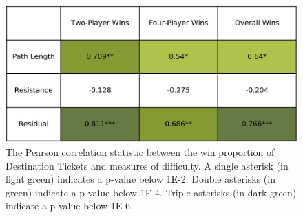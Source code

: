 \begin{multicols}{2}
\begin{figure}[H]
    \centering
    \includegraphics[scale=.12]{figures/pearsons_table.png}
    \caption{The Pearson correlation statistic between
    the win proportion of Destination Tickets
    and measures of difficulty.
    A single asterisk (in light green) indicates a p-value
    below 1E-2. Double asterisks (in green) indicate a
    p-value below 1E-4. Triple asterisks (in dark green)
    indicate a p-value below 1E-6.}
    \label{fig:correlation_table}
\end{figure}

\end{multicols}
